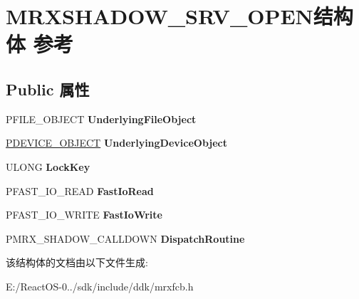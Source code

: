 \hypertarget{struct_m_r_x_s_h_a_d_o_w___s_r_v___o_p_e_n}{}\section{M\+R\+X\+S\+H\+A\+D\+O\+W\+\_\+\+S\+R\+V\+\_\+\+O\+P\+E\+N结构体 参考}
\label{struct_m_r_x_s_h_a_d_o_w___s_r_v___o_p_e_n}
\subsection*{Public 属性}
\begin{DoxyCompactItemize}
\item 
\mbox{\label{struct_m_r_x_s_h_a_d_o_w___s_r_v___o_p_e_n_a4db542c0b5f77ef2441826c8ee938cd1}} 
P\+F\+I\+L\+E\+\_\+\+O\+B\+J\+E\+CT {\bfseries Underlying\+File\+Object}
\item 
\mbox{\label{struct_m_r_x_s_h_a_d_o_w___s_r_v___o_p_e_n_aded87de753dd7e6510f900ab86f96ac8}} 
\hyperlink{struct___d_e_v_i_c_e___o_b_j_e_c_t}{P\+D\+E\+V\+I\+C\+E\+\_\+\+O\+B\+J\+E\+CT} {\bfseries Underlying\+Device\+Object}
\item 
\mbox{\label{struct_m_r_x_s_h_a_d_o_w___s_r_v___o_p_e_n_a04264e9af0d48004bad39608c0962168}} 
U\+L\+O\+NG {\bfseries Lock\+Key}
\item 
\mbox{\label{struct_m_r_x_s_h_a_d_o_w___s_r_v___o_p_e_n_af99862f549244cd49d807faa1878cc4d}} 
P\+F\+A\+S\+T\+\_\+\+I\+O\+\_\+\+R\+E\+AD {\bfseries Fast\+Io\+Read}
\item 
\mbox{\label{struct_m_r_x_s_h_a_d_o_w___s_r_v___o_p_e_n_a80fa24e85408992926dd6b89256c6a3a}} 
P\+F\+A\+S\+T\+\_\+\+I\+O\+\_\+\+W\+R\+I\+TE {\bfseries Fast\+Io\+Write}
\item 
\mbox{\label{struct_m_r_x_s_h_a_d_o_w___s_r_v___o_p_e_n_ad168bcfaa58c16136822d3b49ab4358a}} 
P\+M\+R\+X\+\_\+\+S\+H\+A\+D\+O\+W\+\_\+\+C\+A\+L\+L\+D\+O\+WN {\bfseries Dispatch\+Routine}
\end{DoxyCompactItemize}


该结构体的文档由以下文件生成\+:\begin{DoxyCompactItemize}
\item 
E\+:/\+React\+O\+S-\/0../sdk/include/ddk/mrxfcb.\+h\end{DoxyCompactItemize}
